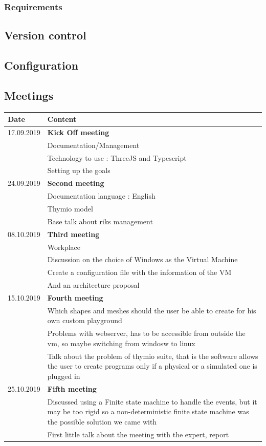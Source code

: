 \documentclass{scrartcl}
\begin{document}
\subsubsection{Requirements}

\subsection{Version control}

\subsection{Configuration}

\subsection{Meetings}
\begin{tabular}{ | m{3cm} | m{10cm} | }
  \hline
  Date & Content \\
  \hline
  17.09.2019 & \textbf{Kick Off meeting}\\
  & Documentation/Management\\
  & Technology to use : ThreeJS and Typescript\\
  & Setting up the goals\\
  \hline
  24.09.2019 & \textbf{Second meeting} \\
  & Documentation language : English \\
  & Thymio model \\
  & Base talk about riks management \\
  \hline
  08.10.2019 & \textbf{Third meeting}\\
  & Workplace\\
  & Discussion on the choice of Windows as the Virtual Machine \\
  & Create a configuration file with the information of the VM \\
  & And an architecture proposal \\
  \hline
  15.10.2019 & \textbf{Fourth meeting} \\
  & Which shapes and meshes should the user be able to create for his own custom playground \\
  & Problems with webserver, has to be accessible from outside the vm, so maybe switching from windosw to linux \\
  & Talk about the problem of thymio suite, that is the software allows the user to create programs only if a physical or a simulated one is plugged in \\
  \hline
  25.10.2019 & \textbf{Fifth meeting} \\
  & Discussed using a Finite state machine to handle the events, but it may be too rigid so a non-deterministic finite state machine was the possible solution we came with \\
  & First little talk about the meeting with the expert, report\\
  \hline
\end{tabular}
\end{document}
